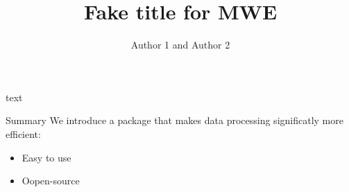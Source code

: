 \documentclass[final]{beamer}
\title{Fake title for MWE} %
\author{Author 1 and Author 2} %
\begin{document}
\begin{frame}
\maketitle
text

\begin{alertblock}{Summary}
We introduce a package that makes data processing
significatly more efficient:
\begin{itemize}
\item Easy to use
\item Oopen-source
\end{itemize}
\end{alertblock}

\end{frame} %
\end{document}
